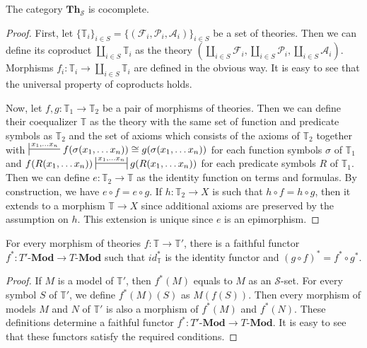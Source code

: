 \documentclass[reqno]{amsart}
\theoremstyle{definition}
\theoremstyle{remark}
\newcommand{\cat}[1]{\mathbf{#1}}
\newcommand{\Mod}[1]{#1\text{-}\cat{Mod}}
\newcommand{\Th}{\cat{Th}}
\numberwithin{figure}{section}
\begin{document}
\begin{prop}[th-cocomplete]
The category $\Th_\mathcal{S}$ is cocomplete.
\end{prop}
\begin{proof}
First, let $\{ \mathbb{T}_i \}_{i \in S} = \{ (\mathcal{F}_i,\mathcal{P}_i,\mathcal{A}_i) \}_{i \in S}$ be a set of theories.
Then we can define its coproduct $\coprod\limits_{i \in S} \mathbb{T}_i$ as the theory
$(\coprod\limits_{i \in S} \mathcal{F}_i, \coprod\limits_{i \in S} \mathcal{P}_i, \coprod\limits_{i \in S} \mathcal{A}_i)$.
Morphisms $f_i : \mathbb{T}_i \to \coprod\limits_{i \in S} \mathbb{T}_i$ are defined in the obvious way.
It is easy to see that the universal property of coproducts holds.

Now, let $f,g : \mathbb{T}_1 \to \mathbb{T}_2$ be a pair of morphisms of theories.
Then we can define their coequalizer $\mathbb{T}$ as the theory with the same set of function and predicate symbols as $\mathbb{T}_2$ and the set of axioms which consists of the axioms of $\mathbb{T}_2$
together with $\sststile{}{x_1, \ldots x_n} f(\sigma(x_1, \ldots x_n)) \cong g(\sigma(x_1, \ldots x_n))$ for each function symbols $\sigma$ of $\mathbb{T}_1$
and $f(R(x_1, \ldots x_n)) \ssststile{}{x_1, \ldots x_n} g(R(x_1, \ldots x_n))$ for each predicate symbols $R$ of $\mathbb{T}_1$.
Then we can define $e : \mathbb{T}_2 \to \mathbb{T}$ as the identity function on terms and formulas.
By construction, we have $e \circ f = e \circ g$.
If $h : \mathbb{T}_2 \to X$ is such that $h \circ f = h \circ g$, then it extends to a morphism $\mathbb{T} \to X$ since additional axioms are preserved by the assumption on $h$.
This extension is unique since $e$ is an epimorphism.
\end{proof}

\begin{prop}
For every morphism of theories $f : \mathbb{T} \to \mathbb{T}'$, there is a faithful functor $f^* : \Mod{T'} \to \Mod{T}$
such that $id_\mathbb{T}^*$ is the identity functor and $(g \circ f)^* = f^* \circ g^*$.
\end{prop}
\begin{proof}
If $M$ is a model of $\mathbb{T}'$, then $f^*(M)$ equals to $M$ as an $\mathcal{S}$-set.
For every symbol $S$ of $\mathbb{T}'$, we define $f^*(M)(S)$ as $M(f(S))$.
Then every morphism of models $M$ and $N$ of $\mathbb{T}'$ is also a morphism of $f^*(M)$ and $f^*(N)$.
These definitions determine a faithful functor $f^* : \Mod{T'} \to \Mod{T}$.
It is easy to see that these functors satisfy the required conditions.
\end{proof}
\end{document}
